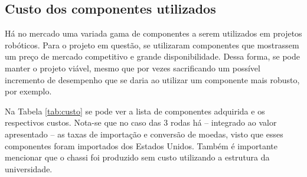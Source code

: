 \subsection{Custo dos componentes utilizados}
\label{sec:custo}

Há no mercado uma variada gama de componentes a serem utilizados em projetos robóticos. Para o projeto em questão, se utilizaram componentes que mostrassem um preço de mercado competitivo e grande disponibilidade. Dessa forma, se pode manter o projeto viável, mesmo que por vezes sacrificando um possível incremento de desempenho que se daria ao utilizar um componente mais robusto, por exemplo.

Na Tabela \ref{tab:custo} se pode ver a lista de componentes adquirida e os respectivos custos. Nota-se que no caso das 3 rodas há -- integrado ao valor apresentado -- as taxas de importação e conversão de moedas, visto que esses componentes foram importados dos Estados Unidos. Também é importante mencionar que o chassi foi produzido sem custo utilizando a estrutura da universidade.

